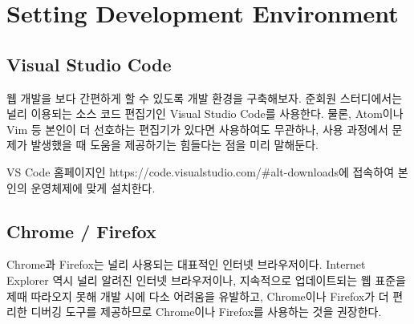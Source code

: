 \section{Setting Development Environment} \label{sect:setting-development-environment}

\subsection*{Visual Studio Code}
웹 개발을 보다 간편하게 할 수 있도록 개발 환경을 구축해보자. 준회원 스터디에서는 널리 이용되는 소스 코드 편집기인 Visual Studio Code를 사용한다. 물론, Atom이나 Vim 등 본인이 더 선호하는 편집기가 있다면 사용하여도 무관하나, 사용 과정에서 문제가 발생했을 때 도움을 제공하기는 힘들다는 점을 미리 말해둔다.

VS Code 홈페이지인 https://code.visualstudio.com/\#alt-downloads에 접속하여 본인의 운영체제에 맞게 설치한다.

\subsection*{Chrome / Firefox}
Chrome과 Firefox는 널리 사용되는 대표적인 인터넷 브라우저이다. Internet Explorer 역시 널리 알려진 인터넷 브라우저이나, 지속적으로 업데이트되는 웹 표준을 제때 따라오지 못해 개발 시에 다소 어려움을 유발하고, Chrome이나 Firefox가 더 편리한 디버깅 도구를 제공하므로 Chrome이나 Firefox를 사용하는 것을 권장한다.
